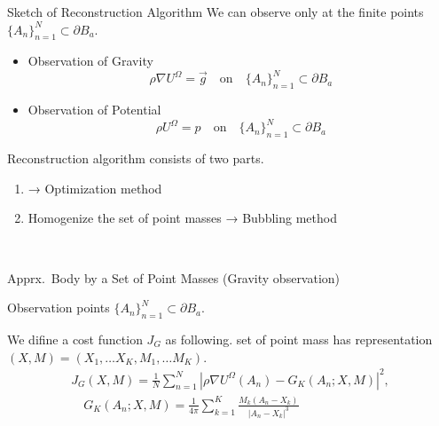 \documentclass[dvipdfmx]{beamer}
\theoremstyle{remark}
\begin{document}
\begin{frame}{Sketch of Reconstruction Algorithm}
  We can observe only at the finite points $\{A_n\}_{n=1}^N\subset\partial B_a$.
  \begin{itemize}
    \item Observation of Gravity
    \[
      \rho\nabla U^{\Omega} = \overrightarrow{g} \quad \mathrm{on} \quad \{A_n\}_{n=1}^N\subset \partial B_a
    \]
  
    \item Observation of Potential
    \[
      \rho U^{\Omega} = p \quad \mathrm{on} \quad \{A_n\}_{n=1}^N\subset \partial B_a
    \]
  \end{itemize}

  Reconstruction algorithm consists of two parts.
  \begin{enumerate}
    \item {} → Optimization method
    \item Homogenize the set of point masses → Bubbling method
  \end{enumerate}
  \ 
\end{frame}



\begin{frame}{Apprx.~Body by a Set of Point Masses (Gravity observation)}

  Observation points $\{A_n\}_{n=1}^N\subset \partial B_a$.
  \begin{figure}
    \centering
  \end{figure}

  We difine a cost function $J_G$ as following.
  set of point mass has representation $(X,M)=(X_1,\dots X_K, M_1,\dots M_K)$.
  \begin{gather*}
    J_G(X, M) = \frac{1}{N}\sum_{n=1}^N\left|\rho\nabla U^{\Omega}(A_n) - G_K(A_n;X,M)\right|^2,\\ 
    \quad G_K(A_n;X,M) = \frac{1}{4\pi}\sum_{k=1}^K\frac{M_k(A_n-X_k)}{|A_n-X_k|^3}
  \end{gather*}
\end{frame}
\end{document}
